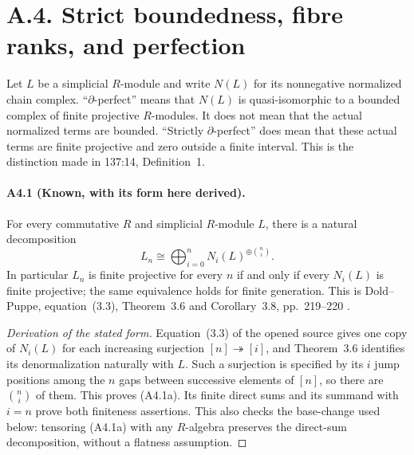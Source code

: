 \section{A.4. Strict boundedness, fibre ranks, and perfection}
\label{sec:A4}

Let $L$ be a simplicial $R$-module and write $N(L)$ for its
nonnegative normalized chain complex.  ``$\partial$-perfect'' means
that $N(L)$ is quasi-isomorphic to a bounded complex of finite
projective $R$-modules.  It does not mean that the actual normalized
terms are bounded.  ``Strictly $\partial$-perfect'' does mean that
these actual terms are finite projective and zero outside a finite
interval.  This is the distinction made in 137:14, Definition~1.

\paragraph{A4.1 (Known, with its form here derived).}
\label{A4.1}
For every commutative $R$ and simplicial $R$-module $L$, there is a
natural decomposition
\[
 L_n\cong\bigoplus_{i=0}^{n}N_i(L)^{\oplus\binom ni}.
 \tag{A4.1a}
\]
In particular $L_n$ is finite projective for every $n$ if and only if
every $N_i(L)$ is finite projective; the same equivalence holds for
finite generation.  This is Dold--Puppe, equation~(3.3),
Theorem~3.6 and Corollary~3.8, pp.~219--220
\cite{DoldPuppe1961}.

\begin{proof}[Derivation of the stated form]
Equation~(3.3) of the opened source gives one copy of $N_i(L)$ for
each increasing surjection $[n]\twoheadrightarrow[i]$, and
Theorem~3.6 identifies its denormalization naturally with $L$.
Such a surjection is specified by its $i$ jump positions among the
$n$ gaps between successive elements of $[n]$, so there are
$\binom ni$ of them.  This proves (A4.1a).  Its finite direct sums
and its summand with $i=n$ prove both finiteness assertions.  This
also checks the base-change used below: tensoring (A4.1a) with any
$R$-algebra preserves the direct-sum decomposition, without a
flatness assumption.
\end{proof}

